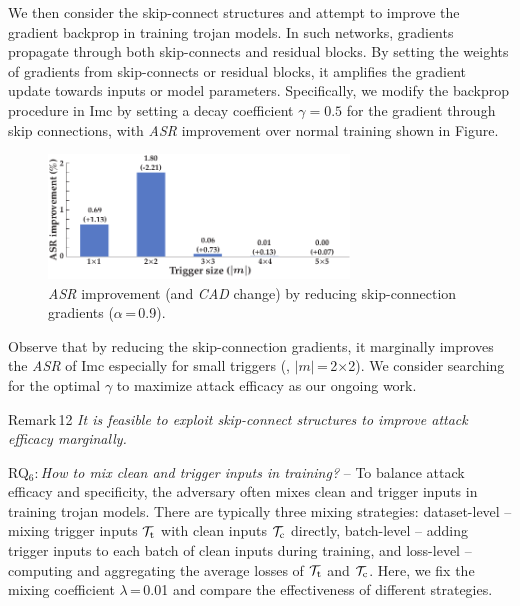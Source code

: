 \documentclass[compsoc,conference,a4paper,10pt,times]{IEEEtran}
\newcommand{\imc}{{\sc Imc}\xspace}
\newcommand{\asr}{{\em \small ASR}\xspace}
\newcommand{\cad}{{\em \small CAD}\xspace}
\begin{document}
We then consider the skip-connect structures and attempt to improve the gradient backprop in training trojan models. In such networks, gradients propagate through both skip-connects and residual blocks. By setting the weights of gradients from skip-connects or residual blocks, it amplifies the gradient update towards inputs or model parameters. Specifically, we modify the backprop procedure in \imc by setting a decay coefficient $\gamma = 0.5$ for the gradient through skip connections, with \asr improvement over normal training shown in Figure.
    

\begin{figure}[!ht]
    \centering
    \includegraphics[width=80mm]{figures/sgm.pdf}
    \caption{\asr improvement (and \cad change) by reducing skip-connection gradients ($\alpha$\,=\,0.9). \label{fig:sgm}}
\end{figure}

Observe that by reducing the skip-connection gradients, it marginally improves the \asr of \imc especially for small triggers (\meg, $|m|$\,=\,2$\times$2). We consider searching for the optimal $\gamma$ to maximize attack efficacy as our ongoing work. 

\begin{mtbox}{\small Remark\,12}
    {\em \small It is feasible to exploit skip-connect structures to improve attack efficacy marginally.}
\end{mtbox}

\vspace{2pt}
{RQ$_6$:\,{\em How to mix clean and trigger inputs in training?}} -- To balance attack efficacy and specificity, the adversary often mixes clean and trigger inputs in training trojan models. There are typically three mixing strategies:  dataset-level -- mixing trigger inputs ${\mathcal{T}}_\mathrm{t}$ with clean inputs ${\mathcal{T}}_\mathrm{c}$ directly,  batch-level -- adding trigger inputs to each batch of clean inputs during training, and  loss-level -- computing and aggregating the average losses of ${\mathcal{T}}_\mathrm{t}$ and ${\mathcal{T}}_\mathrm{c}$. Here, we fix the mixing coefficient $\lambda$\,=\,0.01 and compare the effectiveness of different strategies. 
\end{document}
